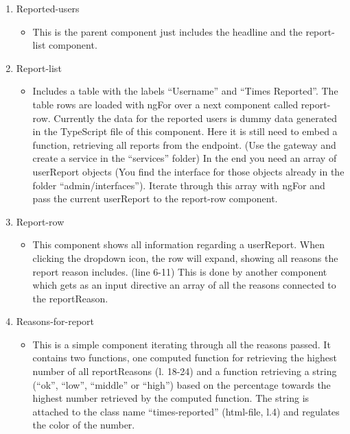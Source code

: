 \begin{enumerate}
\item Reported-users
   \begin{itemize}
     \item This is the parent component just includes the headline and the report-list component.
   \end{itemize}
\item Report-list
   \begin{itemize}
        \item Includes a table with the labels \enquote{Username} and \enquote{Times Reported}. The table rows are loaded with ngFor over a next component called report-row. Currently the data for the reported users is dummy data generated in the TypeScript file of this component. Here it is still need to embed a function, retrieving all reports from the endpoint. (Use the gateway and create a service in the “services” folder) In the end you need an array of userReport objects (You find the interface for those objects already in the folder \enquote{admin/interfaces}). Iterate through this array with ngFor and pass the current userReport to the report-row component.
   \end{itemize}
\item Report-row
   \begin{itemize}
       \item This component shows all information regarding a userReport. When clicking the dropdown icon, the row will expand, showing all reasons the report reason includes. (line 6-11) This is done by another component which gets as an input
       directive an array of all the reasons connected to the reportReason.
   \end{itemize}
\item Reasons-for-report
   \begin{itemize}
      \item This is a simple component iterating through all the reasons passed.
      It contains two functions, one computed function for retrieving the highest number of all reportReasons (l. 18-24) and a function retrieving a string (\enquote{ok}, \enquote{low}, \enquote{middle} or \enquote{high}) based on the percentage towards the highest number retrieved by the computed function. The string is attached to the class name \enquote{times-reported} (html-file, l.4) and regulates the color of the number.
   \end{itemize}
\end{enumerate}

